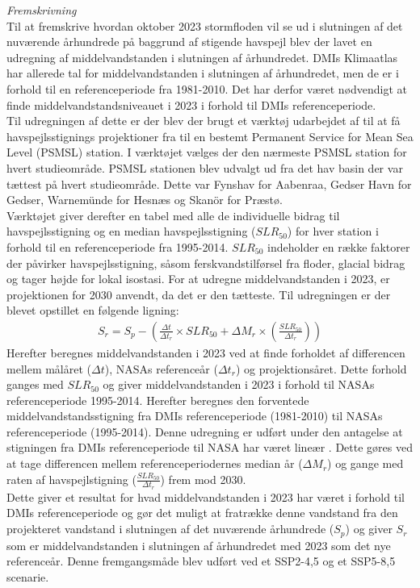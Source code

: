 {\large \textit{Fremskrivning}} \\
Til at fremskrive hvordan oktober 2023 stormfloden vil se ud i slutningen af det nuværende århundrede på baggrund af stigende havspejl blev der lavet en udregning af middelvandstanden i slutningen af århundredet. DMIs Klimaatlas har allerede tal for middelvandstanden i slutningen af århundredet, men de er i forhold til en referenceperiode fra 1981-2010. Det har derfor været nødvendigt at finde middelvandstandsniveauet i 2023 i forhold til DMIs referenceperiode. \\

Til udregningen af dette er der blev der brugt et værktøj udarbejdet af \cite{NASA_tool} til at få havspejlsstignings projektioner fra \cite{garner_ipcc_2021} til en bestemt Permanent Service for Mean Sea Level (PSMSL) station. I værktøjet vælges der den nærmeste PSMSL station for hvert studieområde. PSMSL stationen blev udvalgt ud fra det hav basin der var tættest på hvert studieområde. Dette var Fynshav for Aabenraa, Gedser Havn for Gedser, Warnemünde for Hesnæs og Skanör for Præstø.\\

Værktøjet giver derefter en tabel med alle de individuelle bidrag til havspejlsstigning og en median havspejlsstigning ($SLR_{50}$) for hver station i forhold til en referenceperiode fra 1995-2014. $SLR_{50}$ indeholder en række faktorer der påvirker havspejlsstigning, såsom ferskvandstilførsel fra floder, glacial bidrag og tager højde for lokal isostasi. For at udregne middelvandstanden i 2023, er projektionen for 2030 anvendt, da det er den tætteste. Til udregningen er der blevet opstillet en følgende ligning: 
\begin{align} \label{Equation: Vandstandsstigning calculation}
    S_r = S_p- \left( \frac{\Delta{t}}{\Delta{t_r}}\times SLR_{50} + \Delta{M_r} \times \left(\frac{SLR_{50}}{\Delta{t_r}}\right) \right)
\end{align}
Herefter beregnes middelvandstanden i 2023 ved at finde forholdet af differencen mellem målåret ($\Delta{t}$), NASAs referenceår ($\Delta{t_r}$) og projektionsåret. Dette forhold ganges med $SLR_{50}$ og giver middelvandstanden i 2023 i forhold til NASAs referenceperiode 1995-2014. Herefter beregnes den forventede middelvandstandsstigning fra DMIs referenceperiode (1981-2010) til NASAs referenceperiode (1995-2014). Denne udregning er udført under den antagelse at stigningen fra DMIs referenceperiode til NASA har været lineær \citep{danish_meteorological_institute_dmi_2024}. Dette gøres ved at tage differencen mellem referenceperiodernes median år ($\Delta{M_r}$) og gange med raten af havspejlstigning ($\frac{SLR_{50}}{\Delta{t_r}}$) frem mod 2030. \\
Dette giver et resultat for hvad middelvandstanden i 2023 har været i forhold til DMIs referenceperiode og gør det muligt at fratrække denne vandstand fra den projekteret vandstand i slutningen af det nuværende århundrede ($S_p$) og giver $S_r$ som er middelvandstanden i slutningen af århundredet med 2023 som det nye referenceår. Denne fremgangsmåde blev udført ved et SSP2-4,5 og et SSP5-8,5 scenarie.\\

